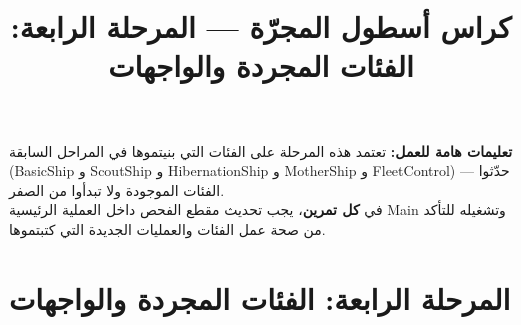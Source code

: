 \documentclass[14pt]{extarticle}
\title{كراس أسطول المجرّة — المرحلة الرابعة: الفئات المجردة والواجهات}
\begin{document}
\maketitle
\thispagestyle{fancy}

\begin{boxWarning}
\textbf{تعليمات هامة للعمل:}
تعتمد هذه المرحلة على الفئات التي بنيتموها في المراحل السابقة (\textenglish{BasicShip} و \textenglish{ScoutShip} و \textenglish{HibernationShip} و \textenglish{MotherShip} و \textenglish{FleetControl}) — حدّثوا الفئات الموجودة ولا تبدأوا من الصفر. \\
في \textbf{كل تمرين}، يجب تحديث مقطع الفحص داخل العملية الرئيسية \textenglish{Main} وتشغيله للتأكد من صحة عمل الفئات والعمليات الجديدة التي كتبتموها.
\end{boxWarning}

\section*{المرحلة الرابعة: الفئات المجردة والواجهات}
\end{document}
